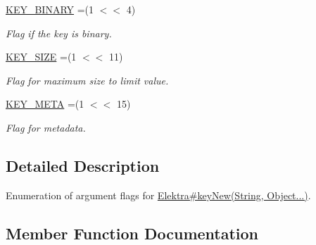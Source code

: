 \begin{DoxyCompactItemize}
\mbox{\label{enumorg_1_1libelektra_1_1Elektra_1_1KeyNewArgumentFlags_ac1f6adb1780c0d090ea6cbf31901ec6e}} 
\hyperlink{enumorg_1_1libelektra_1_1Elektra_1_1KeyNewArgumentFlags_ac1f6adb1780c0d090ea6cbf31901ec6e}{K\+E\+Y\+\_\+\+B\+I\+N\+A\+RY} =(1 $<$$<$ 4)
\begin{DoxyCompactList}\small\item\em Flag if the key is binary. \end{DoxyCompactList}\item 
\mbox{\label{enumorg_1_1libelektra_1_1Elektra_1_1KeyNewArgumentFlags_a8922d42d879dbe8e4a5e647d2e03df20}} 
\hyperlink{enumorg_1_1libelektra_1_1Elektra_1_1KeyNewArgumentFlags_a8922d42d879dbe8e4a5e647d2e03df20}{K\+E\+Y\+\_\+\+S\+I\+ZE} =(1 $<$$<$ 11)
\begin{DoxyCompactList}\small\item\em Flag for maximum size to limit value. \end{DoxyCompactList}\item 
\mbox{\label{enumorg_1_1libelektra_1_1Elektra_1_1KeyNewArgumentFlags_adebcbd2dfa03e4ee0025493e6ed0d0c3}} 
\hyperlink{enumorg_1_1libelektra_1_1Elektra_1_1KeyNewArgumentFlags_adebcbd2dfa03e4ee0025493e6ed0d0c3}{K\+E\+Y\+\_\+\+M\+E\+TA} =(1 $<$$<$ 15)
\begin{DoxyCompactList}\small\item\em Flag for metadata. \end{DoxyCompactList}\end{DoxyCompactItemize}


\subsection{Detailed Description}
Enumeration of argument flags for \hyperlink{}{Elektra\#key\+New(\+String, Object...)}. 

\subsection{Member Function Documentation}
\mbox{\label{enumorg_1_1libelektra_1_1Elektra_1_1KeyNewArgumentFlags_a0af26490c60862970ad8cbb6ccbe00bb}} 
